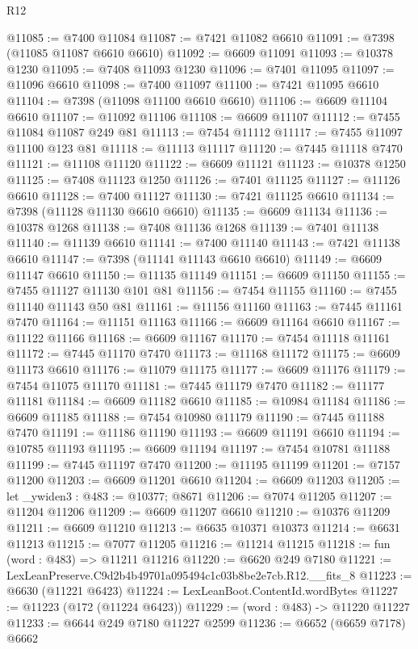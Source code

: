\begin{lexlean}{R12}
\begin{coremodule}
@11085 := @7400 @11084
@11087 := @7421 @11082 @6610
@11091 := @7398 (@11085 @11087 @6610 @6610)
@11092 := @6609 @11091
@11093 := @10378 @1230
@11095 := @7408 @11093 @1230
@11096 := @7401 @11095
@11097 := @11096 @6610
@11098 := @7400 @11097
@11100 := @7421 @11095 @6610
@11104 := @7398 (@11098 @11100 @6610 @6610)
@11106 := @6609 @11104 @6610
@11107 := @11092 @11106
@11108 := @6609 @11107
@11112 := @7455 @11084 @11087 @249 @81
@11113 := @7454 @11112
@11117 := @7455 @11097 @11100 @123 @81
@11118 := @11113 @11117
@11120 := @7445 @11118 @7470
@11121 := @11108 @11120
@11122 := @6609 @11121
@11123 := @10378 @1250
@11125 := @7408 @11123 @1250
@11126 := @7401 @11125
@11127 := @11126 @6610
@11128 := @7400 @11127
@11130 := @7421 @11125 @6610
@11134 := @7398 (@11128 @11130 @6610 @6610)
@11135 := @6609 @11134
@11136 := @10378 @1268
@11138 := @7408 @11136 @1268
@11139 := @7401 @11138
@11140 := @11139 @6610
@11141 := @7400 @11140
@11143 := @7421 @11138 @6610
@11147 := @7398 (@11141 @11143 @6610 @6610)
@11149 := @6609 @11147 @6610
@11150 := @11135 @11149
@11151 := @6609 @11150
@11155 := @7455 @11127 @11130 @101 @81
@11156 := @7454 @11155
@11160 := @7455 @11140 @11143 @50 @81
@11161 := @11156 @11160
@11163 := @7445 @11161 @7470
@11164 := @11151 @11163
@11166 := @6609 @11164 @6610
@11167 := @11122 @11166
@11168 := @6609 @11167
@11170 := @7454 @11118 @11161
@11172 := @7445 @11170 @7470
@11173 := @11168 @11172
@11175 := @6609 @11173 @6610
@11176 := @11079 @11175
@11177 := @6609 @11176
@11179 := @7454 @11075 @11170
@11181 := @7445 @11179 @7470
@11182 := @11177 @11181
@11184 := @6609 @11182 @6610
@11185 := @10984 @11184
@11186 := @6609 @11185
@11188 := @7454 @10980 @11179
@11190 := @7445 @11188 @7470
@11191 := @11186 @11190
@11193 := @6609 @11191 @6610
@11194 := @10785 @11193
@11195 := @6609 @11194
@11197 := @7454 @10781 @11188
@11199 := @7445 @11197 @7470
@11200 := @11195 @11199
@11201 := @7157 @11200
@11203 := @6609 @11201 @6610
@11204 := @6609 @11203
@11205 := let _ywiden3 : @483 := @10377; @8671
@11206 := @7074 @11205
@11207 := @11204 @11206
@11209 := @6609 @11207 @6610
@11210 := @10376 @11209
@11211 := @6609 @11210
@11213 := @6635 @10371 @10373
@11214 := @6631 @11213
@11215 := @7077 @11205
@11216 := @11214 @11215
@11218 := fun (word : @483) => @11211 @11216
@11220 := @6620 @249 @7180
@11221 := LexLeanPreserve.C9d2b4b49701a095494c1c03b8be2e7cb.R12.__fits_8
@11223 := @6630 (@11221 @6423)
@11224 := LexLeanBoot.ContentId.wordBytes
@11227 := @11223 (@172 (@11224 @6423))
@11229 := (word : @483) -> @11220 @11227
@11233 := @6644 @249 @7180 @11227 @2599
@11236 := @6652 (@6659 @7178) @6662

\end{coremodule}
\end{lexlean}
